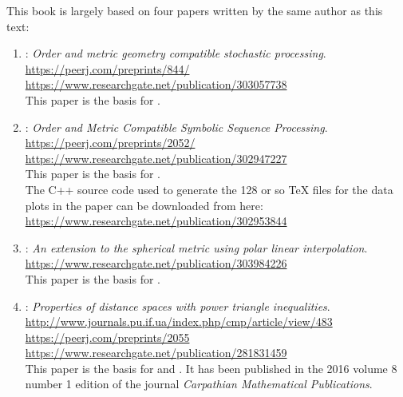 
This book is largely based on four papers written by the same author as this text:

\begin{enumerate}
  \item {}: \emph{Order and metric geometry compatible stochastic processing}.
    \\\url{https://peerj.com/preprints/844/}
    \\\url{https://www.researchgate.net/publication/303057738}
    \\This paper is the basis for .
  \item {}: \emph{Order and Metric Compatible Symbolic Sequence Processing}.
    \\\url{https://peerj.com/preprints/2052/}
    \\\url{https://www.researchgate.net/publication/302947227}
    \\This paper is the basis for .
    \\The C++ source code used to generate the 128 or so TeX files for the data plots in the paper can be downloaded from here:
    \\\url{https://www.researchgate.net/publication/302953844}
  \item {}: \emph{An extension to the spherical metric using polar linear interpolation}.
    \\\url{https://www.researchgate.net/publication/303984226}
    \\This paper is the basis for .
  \item {}: \emph{Properties of distance spaces with power triangle inequalities}.
    \\\url{http://www.journals.pu.if.ua/index.php/cmp/article/view/483}
    \\\url{https://peerj.com/preprints/2055}
    \\\url{https://www.researchgate.net/publication/281831459}
    \\This paper is the basis for  and .
    It has been published in the 2016 volume 8 number 1 edition of the 
    journal \emph{Carpathian Mathematical Publications}.
\end{enumerate}




